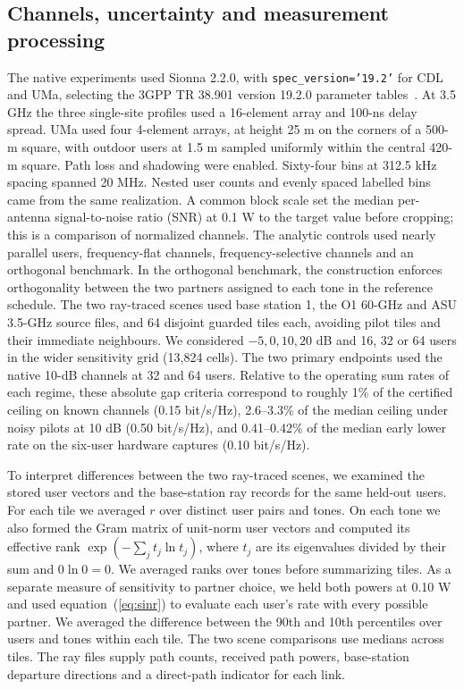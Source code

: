 \documentclass[lineno,pdflatex,sn-nature]{sn-jnl}
\begin{document}
\subsection*{Channels, uncertainty and measurement processing}
The native experiments used Sionna 2.2.0, with \texttt{spec\_version='19.2'} for CDL and UMa, selecting the 3GPP TR 38.901 version 19.2.0 parameter tables~\cite{tr,sionna}. At 3.5 GHz the three single-site profiles used a 16-element array and 100-ns delay spread. UMa used four 4-element arrays, at height 25 m on the corners of a 500-m square, with outdoor users at 1.5 m sampled uniformly within the central 420-m square. Path loss and shadowing were enabled. Sixty-four bins at 312.5 kHz spacing spanned 20 MHz. Nested user counts and evenly spaced labelled bins came from the same realization. A common block scale set the median per-antenna signal-to-noise ratio (SNR) at 0.1 W to the target value before cropping; this is a comparison of normalized channels. The analytic controls used nearly parallel users, frequency-flat channels, frequency-selective channels and an orthogonal benchmark. In the orthogonal benchmark, the construction enforces orthogonality between the two partners assigned to each tone in the reference schedule. The two ray-traced scenes used base station 1, the O1 60-GHz and ASU 3.5-GHz source files, and 64 disjoint guarded tiles each, avoiding pilot tiles and their immediate neighbours. We considered \(-5,0,10,20\) dB and 16, 32 or 64 users in the wider sensitivity grid (13,824 cells). The two primary endpoints used the native 10-dB channels at 32 and 64 users. Relative to the operating sum rates of each regime, these absolute gap criteria correspond to roughly 1\% of the certified ceiling on known channels (0.15 bit/s/Hz), 2.6--3.3\% of the median ceiling under noisy pilots at 10 dB (0.50 bit/s/Hz), and 0.41--0.42\% of the median early lower rate on the six-user hardware captures (0.10 bit/s/Hz).

To interpret differences between the two ray-traced scenes, we examined the stored user vectors and the base-station ray records for the same held-out users. For each tile we averaged \(r\) over distinct user pairs and tones. On each tone we also formed the Gram matrix of unit-norm user vectors and computed its effective rank \(\exp(-\sum_j t_j\ln t_j)\), where \(t_j\) are its eigenvalues divided by their sum and \(0\ln0=0\). We averaged ranks over tones before summarizing tiles. As a separate measure of sensitivity to partner choice, we held both powers at 0.10 W and used equation~(\ref{eq:sinr}) to evaluate each user's rate with every possible partner. We averaged the difference between the 90th and 10th percentiles over users and tones within each tile. The two scene comparisons use medians across tiles. The ray files supply path counts, received path powers, base-station departure directions and a direct-path indicator for each link.
\end{document}
